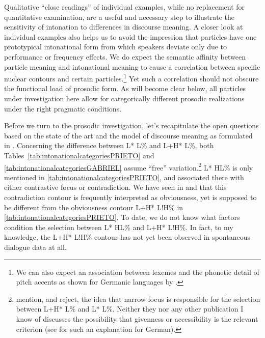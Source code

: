 Qualitative ``close readings'' of individual examples, while no replacement for quantitative examination, are a useful and necessary step to illustrate the sensitivity of intonation to differences in discourse meaning. A closer look at individual examples also helps us to avoid the impression that particles have one prototypical intonational form from which speakers deviate only due to performance or frequency effects. We do expect the semantic affinity between particle meaning and intonational meaning to cause a correlation between specific nuclear contours and certain particles.\footnote{We can also expect an association between lexemes and the phonetic detail of pitch accents as shown for Germanic languages by \citet{SchweitzerETAL.2015}.} Yet such a correlation should not obscure the functional load of prosodic form. As will become clear below, all particles under investigation here allow for categorically different prosodic realizations under the right pragmatic conditions.

Before we turn to the prosodic investigation, let's recapitulate the open questions based on the state of the art and the model of discourse meaning as formulated in . Concerning the difference between L* L\% and L+H* L\%, both Tables~\ref{tab:intonationalcategoriesPRIETO} and \ref{tab:intonationalcategoriesGABRIEL} assume ``free'' variation.\footnote{\citet[364]{HualdePrieto2015} mention, and reject, the idea that narrow focus is responsible for the selection between L+H* L\% and L* L\%. Neither they nor any other publication I know of discusses the possibility that givenness or accessibility is the relevant criterion (see \citet{Baumann2006} for such an explanation for German).} L* HL\% is only mentioned in \autoref{tab:intonationalcategoriesPRIETO}, and associated there with either contrastive focus or contradiction. We have seen in  and  that this contradiction contour is frequently interpreted as obviousness, yet is supposed to be different from the obviousness contour L+H* L!H\% in \autoref{tab:intonationalcategoriesPRIETO}. To date, we do not know what factors condition the selection between L* HL\% and L+H* L!H\%. In fact, to my knowledge, the L+H* L!H\% contour has not yet been observed in spontaneous dialogue data at all.

